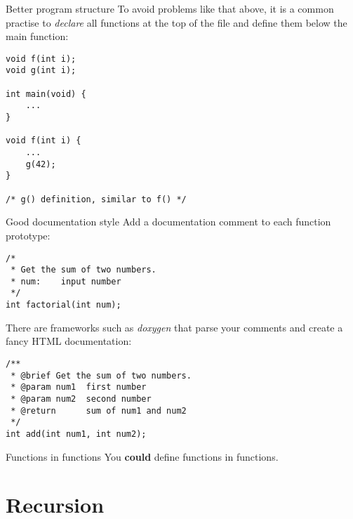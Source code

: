 \begin{frame}[fragile]{Better program structure}
	To avoid problems like that above, it is a common practise to \textit{declare} all functions at the top of the file and define them below the main function:
	\begin{lstlisting}
void f(int i);
void g(int i);

int main(void) {
	...
}

void f(int i) {
	...
	g(42);
}

/* g() definition, similar to f() */
\end{lstlisting}
\end{frame}

\begin{frame}[fragile]{Good documentation style}
    Add a documentation comment to each function prototype:
    \begin{lstlisting}
/*
 * Get the sum of two numbers.
 * num:    input number
 */
int factorial(int num);
\end{lstlisting}
    There are frameworks such as \emph{doxygen} that parse your comments and
    create a fancy HTML documentation:
    \begin{lstlisting}[escapeinside={}]
/**
 * @brief Get the sum of two numbers.
 * @param num1  first number
 * @param num2  second number
 * @return      sum of num1 and num2
 */
int add(int num1, int num2);
\end{lstlisting}
\end{frame}

\begin{frame}{Functions in functions}
	You \textbf{could} define functions in functions.\footnotemark
	
\end{frame}
\section{Recursion}
